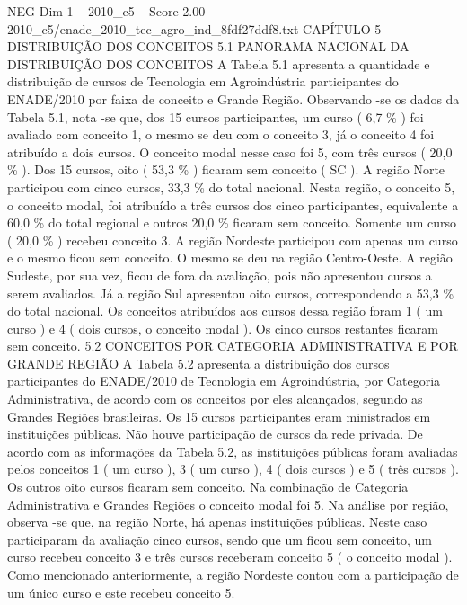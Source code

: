 \begin{textsample}{NEG Dim 1 – 2010\_c5 – Score 2.00 – 2010\_c5/enade\_2010\_tec\_agro\_ind\_8fdf27ddf8.txt}  \label{ex:f1_neg_301}
CAPÍTULO 5 DISTRIBUIÇÃO DOS CONCEITOS 5.1 PANORAMA NACIONAL DA DISTRIBUIÇÃO DOS CONCEITOS A Tabela 5.1 apresenta a quantidade e distribuição de cursos de Tecnologia em Agroindústria participantes do ENADE/2010 por faixa de conceito e Grande Região.
Observando -se os dados da Tabela 5.1, nota -se que, dos 15 cursos participantes, um curso ( 6,7 \% ) foi avaliado com conceito 1, o mesmo se deu com o conceito 3, já o conceito 4 foi atribuído a dois cursos.
O conceito modal nesse caso foi 5, com três cursos ( 20,0 \% ).
Dos 15 cursos, oito ( 53,3 \% ) ficaram sem conceito ( SC ).
A região Norte participou com cinco cursos, 33,3 \% do total nacional.
Nesta região, o conceito 5, o conceito modal, foi atribuído a três cursos dos cinco participantes, equivalente a 60,0 \% do total regional e outros 20,0 \% ficaram sem conceito.
Somente um curso ( 20,0 \% ) recebeu conceito 3.
A região Nordeste participou com apenas um curso e o mesmo ficou sem conceito.
O mesmo se deu na região Centro-Oeste.
A região Sudeste, por sua vez, ficou de fora da avaliação, pois não apresentou cursos a serem avaliados.
Já a região Sul apresentou oito cursos, correspondendo a 53,3 \% do total nacional.
Os conceitos atribuídos aos cursos dessa região foram 1 ( um curso ) e 4 ( dois cursos, o conceito modal ).
Os cinco cursos restantes ficaram sem conceito. 5.2 CONCEITOS POR CATEGORIA ADMINISTRATIVA E POR GRANDE REGIÃO A Tabela 5.2 apresenta a distribuição dos cursos participantes do ENADE/2010 de Tecnologia em Agroindústria, por Categoria Administrativa, de acordo com os conceitos por eles alcançados, segundo as Grandes Regiões brasileiras.
Os 15 cursos participantes eram ministrados em instituições públicas.
Não houve participação de cursos da rede privada.
De acordo com as informações da Tabela 5.2, as instituições públicas foram avaliadas pelos conceitos 1 ( um curso ), 3 ( um curso ), 4 ( dois cursos ) e 5 ( três cursos ).
Os outros oito cursos ficaram sem conceito.
Na combinação de Categoria Administrativa e Grandes Regiões o conceito modal foi 5.
Na análise por região, observa -se que, na região Norte, há apenas instituições públicas.
Neste caso participaram da avaliação cinco cursos, sendo que um ficou sem conceito, um curso recebeu conceito 3 e três cursos receberam conceito 5 ( o conceito modal ).
Como mencionado anteriormente, a região Nordeste contou com a participação de um único curso e este recebeu conceito 5.

\end{textsample}
